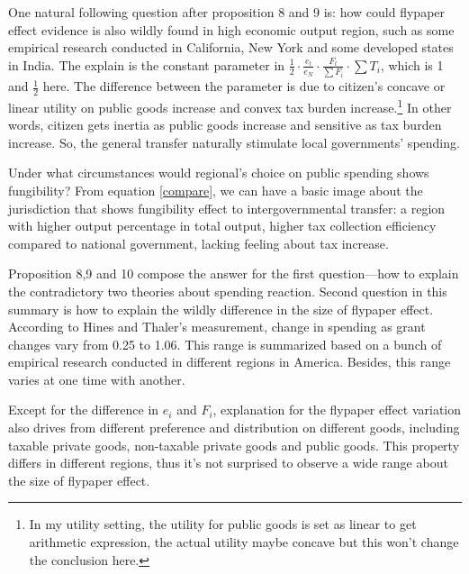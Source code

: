 One natural following question after proposition 8 and 9 is: how could flypaper effect evidence is also wildly found in high economic output region, such as some empirical research conducted in California, New York and some developed states in India\cite{nguyen2020flypaper,bae2004flypaper,lalvani2002flypaper}. The explain is the constant parameter in $\frac{1}{2}\cdot \frac{e_l}{e_N}\cdot \frac{F_l}{\sum F_i} \cdot \sum T_i$, which is 1 and $\frac{1}{2}$ here. The difference between the parameter is due to citizen's concave or linear utility on public goods increase and convex tax burden increase.\footnote{In my utility setting, the utility for public goods is set as linear to get arithmetic expression, the actual utility maybe concave but this won't change the conclusion here.} In other words, citizen gets inertia as public goods increase and sensitive as tax burden increase. So, the general transfer naturally stimulate local governments' spending.

Under what circumstances would regional's choice on public spending shows fungibility? From equation \ref*{compare}, we can have a basic image about the jurisdiction that shows fungibility effect to intergovernmental transfer: a region with higher output percentage in total output, higher tax collection efficiency compared to national government, lacking feeling about tax increase.

Proposition 8,9 and 10 compose the answer for the first question---how to explain the contradictory two theories about spending reaction. Second question in this summary is how to explain the wildly difference in the size of flypaper effect. According to Hines and Thaler's measurement, change in spending as grant changes vary from 0.25 to 1.06\cite{hines1995anomalies}. This range is summarized based on a bunch of empirical research conducted in different regions in America. Besides, this range varies at one time with another\cite{nguyen2020flypaper}.

Except for the difference in $e_i$ and $F_i$, explanation for the flypaper effect variation also drives from different preference and distribution on different goods, including taxable private goods, non-taxable private goods and public goods. This property differs in different regions, thus it's not surprised to observe a wide range about the size of flypaper effect.

